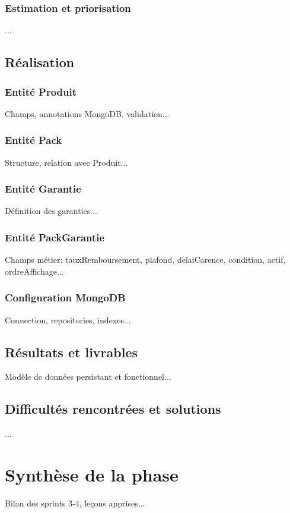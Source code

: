 \documentclass[12pt,a4paper]{report}
\begin{document}
\subsubsection{Estimation et priorisation}
...

\subsection{Réalisation}
\subsubsection{Entité Produit}
Champs, annotations MongoDB, validation...

\subsubsection{Entité Pack}
Structure, relation avec Produit...

\subsubsection{Entité Garantie}
Définition des garanties...

\subsubsection{Entité PackGarantie}
Champs métier: tauxRemboursement, plafond, delaiCarence, condition, actif, ordreAffichage...

\subsubsection{Configuration MongoDB}
Connection, repositories, indexes...

\subsection{Résultats et livrables}
Modèle de données persistant et fonctionnel...

\subsection{Difficultés rencontrées et solutions}
...

\section{Synthèse de la phase}
Bilan des sprints 3-4, leçons apprises...
\end{document}
